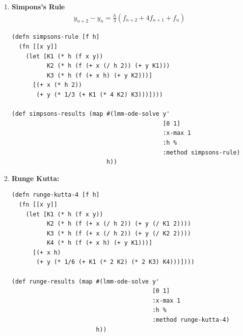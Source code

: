 {\begin{enumerate}[leftmargin=0pt]
\begin{verbatim}
(defn trapezoidal-rule [f h]
  (fn [[x y]]
    (let [K1 (* h (f x y))
          K2 (* h (f (+ x h) (+ y K1)))]
      [(+ x h)
       (+ y (* 1/2 (+ K1 K2)))])))

(def trapezoid-results (map #(lmm-ode-solve y'
                                            [0 1]
                                            :x-max 1
                                            :h %
                                            :method trapezoidal-rule)
                            h))
\end{verbatim}

\item \textbf{Simpons's Rule}
\begin{align}
  y_{n+2} - y_n = \frac{h}{3} (f_{n+2} + 4 f_{n+1} + f_n)
\end{align}

\begin{verbatim}
(defn simpsons-rule [f h]
  (fn [[x y]]
    (let [K1 (* h (f x y))
          K2 (* h (f (+ x (/ h 2)) (+ y K1)))
          K3 (* h (f (+ x h) (+ y K2)))]
      [(+ x (* h 2))
       (+ y (* 1/3 (+ K1 (* 4 K2) K3)))])))

(def simpsons-results (map #(lmm-ode-solve y'
                                           [0 1]
                                           :x-max 1
                                           :h %
                                           :method simpsons-rule)
                           h))
\end{verbatim}

\item \textbf{Runge Kutta:}

\begin{verbatim}
(defn runge-kutta-4 [f h]
  (fn [[x y]]
    (let [K1 (* h (f x y))
          K2 (* h (f (+ x (/ h 2)) (+ y (/ K1 2))))
          K3 (* h (f (+ x (/ h 2)) (+ y (/ K2 2))))
          K4 (* h (f (+ x h) (+ y K1)))]
      [(+ x h)
       (+ y (* 1/6 (+ K1 (* 2 K2) (* 2 K3) K4)))])))

(def runge-results (map #(lmm-ode-solve y'
                                        [0 1]
                                        :x-max 1
                                        :h %
                                        :method runge-kutta-4)
                        h))
\end{verbatim}


\end{enumerate}}
